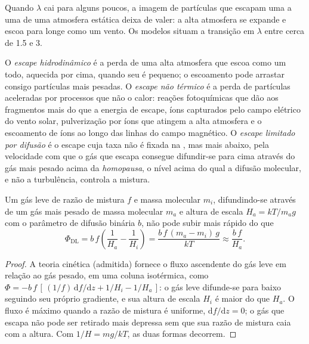 
Quando $\lambda$ cai para alguns poucos, a imagem de partículas que escapam uma a uma
de uma atmosfera estática deixa de valer: a alta atmosfera se expande e escoa
para longe como um vento. Os modelos situam a transição em $\lambda$ entre cerca de 1.5
e 3.

\begin{definition}\label{def:b3:planetary-atmospheres:hydrodynamic}
O \emph{escape hidrodinâmico} é a perda de uma
alta atmosfera que escoa como um todo, aquecida por cima, quando seu
 é pequeno; o escoamento pode arrastar consigo partículas mais pesadas.
O \emph{escape não térmico} é a perda de
partículas aceleradas por processos que não o calor: reações fotoquímicas
que dão aos fragmentos mais do que a energia de escape, íons capturados
pelo campo elétrico do vento solar, pulverização por íons que atingem
a alta atmosfera e o escoamento de íons ao longo das linhas do campo magnético.
O \emph{escape limitado por difusão} é o escape
cuja taxa não é fixada na , mas mais abaixo, pela velocidade com que
o gás que escapa consegue difundir-se para cima através do gás mais pesado acima da
\emph{homopausa}, o nível acima do qual a difusão molecular,
e não a turbulência, controla a mistura.
\end{definition}

\begin{proposition}\label{prop:b3:planetary-atmospheres:diffusion}
Um gás leve de razão de mistura $f$ e massa molecular $m_i$, difundindo-se
através de um gás mais pesado de massa molecular $m_a$ e altura de escala $H_a =
kT/m_a g$ com o parâmetro de difusão binária $b$, não pode subir mais rápido
do que
\[
\Phi_\mathrm{DL} = b\,f\left(\frac1{H_a} - \frac1{H_i}\right)
= \frac{b\,f\,(m_a - m_i)\,g}{kT} \approx \frac{b\,f}{H_a}.
\]
\end{proposition}

\begin{proof}
A teoria cinética (admitida) fornece o fluxo ascendente do gás leve
em relação ao gás pesado, em uma coluna isotérmica, como $\Phi = -b\,f\,
[\,(1/f)\,\mathrm df/\mathrm dz + 1/H_i - 1/H_a\,]$: o gás leve
difunde-se para baixo seguindo seu próprio gradiente, e sua altura de escala $H_i$ é maior
do que $H_a$. O fluxo é máximo quando a razão de mistura é uniforme, $\mathrm
df/\mathrm dz = 0$; o gás que escapa não pode ser retirado mais depressa sem que sua
razão de mistura caia com a altura. Com $1/H = mg/kT$, as duas
formas decorrem.
\end{proof}

